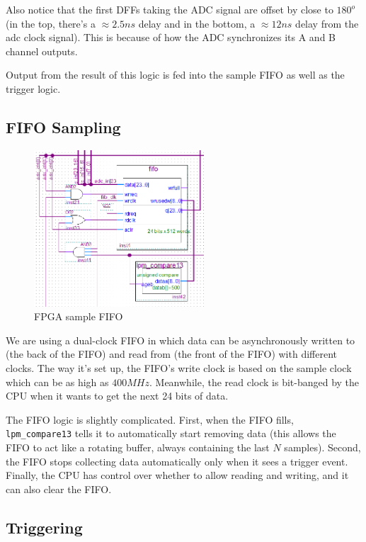 Also notice that the first DFFs taking the ADC signal are offset by close to $180^o$ (in the top, there's a $\approx 2.5ns$ delay and in the bottom, a $\approx 12ns$ delay from the adc clock signal). This is because of how the ADC synchronizes its A and B channel outputs.

Output from the result of this logic is fed into the sample FIFO as well as the trigger logic.

\subsection{FIFO Sampling}

\begin{figure}[ht!]
    \centering
    \includegraphics[width=2.5in]{fpga_logic/adc_fifo.png}
		\caption{FPGA sample FIFO}
\end{figure}

We are using a dual-clock FIFO in which data can be asynchronously written to (the back of the FIFO) and read from (the front of the FIFO) with different clocks. The way it's set up, the FIFO's write clock is based on the sample clock which can be as high as $400MHz$. Meanwhile, the read clock is bit-banged by the CPU when it wants to get the next 24 bits of data.

The FIFO logic is slightly complicated. First, when the FIFO fills, \verb=lpm_compare13= tells it to automatically start removing data (this allows the FIFO to act like a rotating buffer, always containing the last $N$ samples). Second, the FIFO stops collecting data automatically only when it sees a trigger event. Finally, the CPU has control over whether to allow reading and writing, and it can also clear the FIFO.

\subsection{Triggering}

